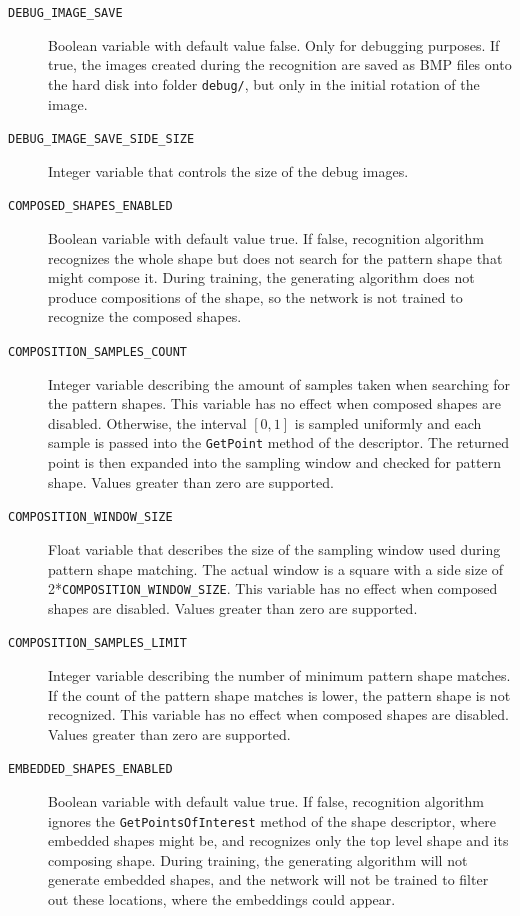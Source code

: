 \begin{description}
\item[\texttt{DEBUG\_IMAGE\_SAVE}] Boolean variable with default value false. Only for debugging purposes. If true, the images created during the recognition are saved as BMP files onto the hard disk into folder \texttt{debug/}, but only in the initial rotation of the image.

\item[\texttt{DEBUG\_IMAGE\_SAVE\_SIDE\_SIZE}] Integer variable that controls the size of the debug images.

\item[\texttt{COMPOSED\_SHAPES\_ENABLED}] Boolean variable with default value true. If false, recognition algorithm recognizes the whole shape but does not search for the pattern shape that might compose it. During training, the generating algorithm does not produce compositions of the shape, so the network is not trained to recognize the composed shapes.

\item[\texttt{COMPOSITION\_SAMPLES\_COUNT}] Integer variable describing the amount of samples taken when searching for the pattern shapes. This variable has no effect when composed shapes are disabled. Otherwise, the interval $[0,1]$ is sampled uniformly and each sample is passed into the \texttt{GetPoint} method of the descriptor. The returned point is then expanded into the sampling window and checked for pattern shape. Values greater than zero are supported.

\item[\texttt{COMPOSITION\_WINDOW\_SIZE}] Float variable that describes the size of the sampling window used during pattern shape matching. The actual window is a square with a side size of 2*\texttt{COMPOSITION\_WINDOW\_SIZE}. This variable has no effect when composed shapes are disabled. Values greater than zero are supported.

\item[\texttt{COMPOSITION\_SAMPLES\_LIMIT}] Integer variable describing the number of minimum pattern shape matches. If the count of the pattern shape matches is lower, the pattern shape is not recognized. This variable has no effect when composed shapes are disabled. Values greater than zero are supported.

\item[\texttt{EMBEDDED\_SHAPES\_ENABLED}] Boolean variable with default value true. If false, recognition algorithm ignores the \texttt{GetPointsOfInterest} method of the shape descriptor, where embedded shapes might be, and recognizes only the top level shape and its composing shape. During training, the generating algorithm will not generate embedded shapes, and the network will not be trained to filter out these locations, where the embeddings could appear.


\end{description}
